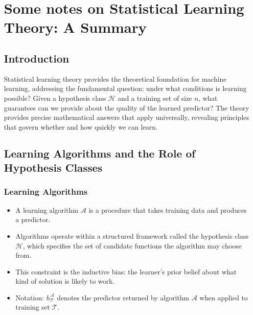 
\chapter{Some notes on Statistical Learning Theory: A Summary}

\section*{Introduction}
Statistical learning theory provides the theoretical foundation for machine learning, addressing the fundamental question: under what conditions is learning possible? Given a hypothesis class $\mathcal{H}$ and a training set of size $n$, what guarantees can we provide about the quality of the learned predictor? The theory provides precise mathematical answers that apply universally, revealing principles that govern whether and how quickly we can learn.

\section*{Learning Algorithms and the Role of Hypothesis Classes}

\subsection*{Learning Algorithms}
\begin{itemize}
    \item A learning algorithm $\mathcal{A}$ is a procedure that takes training data and produces a predictor.
    \item Algorithms operate within a structured framework called the \alert{hypothesis class} $\mathcal{H}$, which specifies the set of candidate functions the algorithm may choose from.
    \item This constraint is the \alert{inductive bias}: the learner's prior belief about what kind of solution is likely to work.
    \item Notation: $h^{\mathcal{A}}_{\mathcal{T}}$ denotes the predictor returned by algorithm $\mathcal{A}$ when applied to training set $\mathcal{T}$.
\end{itemize}

